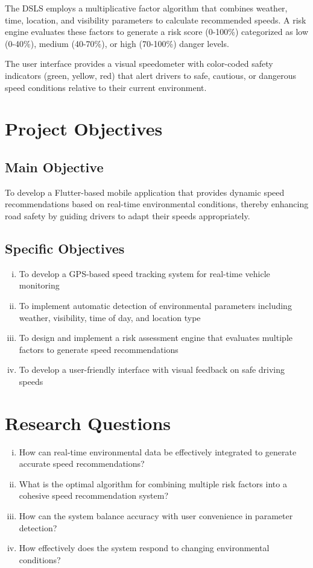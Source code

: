 The DSLS employs a multiplicative factor algorithm that combines weather, time, location, and visibility parameters to calculate recommended speeds. A risk engine evaluates these factors to generate a risk score (0-100\%) categorized as low (0-40\%), medium (40-70\%), or high (70-100\%) danger levels.

The user interface provides a visual speedometer with color-coded safety indicators (green, yellow, red) that alert drivers to safe, cautious, or dangerous speed conditions relative to their current environment.

\section{Project Objectives}
\subsection{Main Objective}
To develop a Flutter-based mobile application that provides dynamic speed recommendations based on real-time environmental conditions, thereby enhancing road safety by guiding drivers to adapt their speeds appropriately.

\subsection{Specific Objectives}
\begin{enumerate}[(i)]
    \item To develop a GPS-based speed tracking system for real-time vehicle monitoring
    \item To implement automatic detection of environmental parameters including weather, visibility, time of day, and location type
    \item To design and implement a risk assessment engine that evaluates multiple factors to generate speed recommendations
    \item To develop a user-friendly interface with visual feedback on safe driving speeds
\end{enumerate}

\section{Research Questions}
\begin{enumerate}[(i)]
    \item How can real-time environmental data be effectively integrated to generate accurate speed recommendations?
    \item What is the optimal algorithm for combining multiple risk factors into a cohesive speed recommendation system?
    \item How can the system balance accuracy with user convenience in parameter detection?
    \item How effectively does the system respond to changing environmental conditions?
\end{enumerate}

